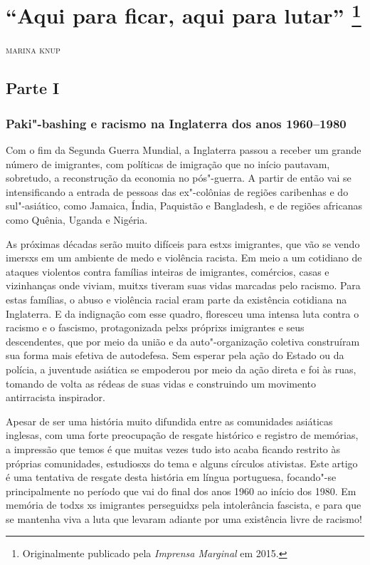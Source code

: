 \chapter[``Aqui para ficar, aqui para lutar'']{``Aqui para ficar, aqui para lutar'' \footnote[*]{Originalmente publicado pela \emph{Imprensa Marginal} em 2015.}}

\hfill{}\textsc{marina knup}

\bigskip

\section{Parte I}

\subsection{Paki"-bashing e racismo na Inglaterra dos anos 1960--1980}

Com o fim da Segunda Guerra Mundial, a Inglaterra passou a receber um grande número de imigrantes, com políticas de imigração que no início pautavam, sobretudo, a reconstrução da economia no pós"-guerra. A partir de então vai se intensificando a entrada de pessoas das ex"-colônias de regiões caribenhas e do sul"-asiático, como Jamaica, Índia, Paquistão e Bangladesh, e de regiões africanas como Quênia, Uganda e Nigéria.

As próximas décadas serão muito difíceis para estxs imigrantes, que vão se vendo imersxs em um ambiente de medo e violência racista. Em meio a um cotidiano de ataques violentos contra famílias inteiras de imigrantes, comércios, casas e vizinhanças onde viviam, muitxs tiveram suas vidas marcadas pelo racismo. Para estas famílias, o abuso e violência racial eram parte da existência cotidiana na Inglaterra. E da indignação com esse quadro, floresceu uma intensa luta contra o racismo e o fascismo, protagonizada pelxs próprixs imigrantes e seus descendentes, que por meio da união e da auto"-organização coletiva construíram sua forma mais efetiva de autodefesa. Sem esperar pela ação do Estado ou da polícia, a juventude asiática se empoderou por meio da ação direta e foi às ruas, tomando de volta as rédeas de suas vidas e construindo um movimento antirracista inspirador.

Apesar de ser uma história muito difundida entre as comunidades asiáticas inglesas, com uma forte preocupação de resgate histórico e registro de memórias, a impressão que temos é que muitas vezes tudo isto acaba ficando restrito às próprias comunidades, estudiosxs do tema e alguns círculos ativistas. Este artigo é uma tentativa de resgate desta história em língua portuguesa, focando"-se principalmente no período que vai do final dos anos 1960 ao início dos 1980. Em memória de todxs xs imigrantes perseguidxs pela intolerância fascista, e para que se mantenha viva a luta que levaram adiante por uma existência livre de racismo!

